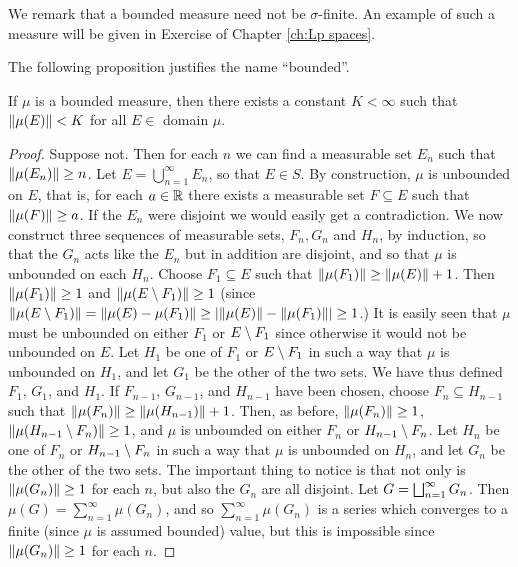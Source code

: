 We remark that a bounded measure need not be $\sigma$-finite. An example of such a measure will be given in Exercise of Chapter \ref{ch:Lp spaces}.

The following proposition justifies the name ``bounded''.

\begin{proposition}\label{prop:bounded measure are bounded}
If $\mu$ is a bounded measure, then there exists a constant $K<\infty$ such that $\norm{\mu(E)}<K$ for all $E\in$ domain $\mu$.
\end{proposition}

\begin{proof}
Suppose not. Then for each $n$ we can find a measurable set $E_n$ such that $\norm{\mu(E_n)}\geq n$. Let $E=\bigcup_{n=1}^\infty E_n$, so that $E\in S$. By construction, $\mu$ is unbounded on $E$, that is, for each $a\in\mathbb{R}$ there exists a measurable set $F\subseteq E$ such that $\norm{\mu(F)}\geq a$. If the $E_n$ were disjoint we would easily get a contradiction. We now construct three sequences of measurable sets, $F_n, G_n$ and $H_n$, by induction, so that the $G_n$ acts like the $E_n$ but in addition are disjoint, and so that $\mu$ is unbounded on each $H_n$. Choose $F_1\subseteq E$ such that $\norm{\mu(F_1)}\geq\norm{\mu(E)}+1$. Then $\norm{\mu(F_1)}\geq1$ and $\norm{\mu(E\setminus F_1)}\geq1$ (since $\norm{\mu(E\setminus F_1)}=\norm{\mu(E)-\mu(F_1)}\geq|\norm{\mu(E)}-\norm{\mu(F_1)}|\geq1$.) It is easily seen that $\mu$ must be unbounded on either $F_1$ or $E\setminus F_1$ since otherwise it would not be unbounded on $E$. Let $H_1$ be one of $F_1$ or $E\setminus F_1$ in such a way that $\mu$ is unbounded on $H_1$, and let $G_1$ be the other of the two sets. We have thus defined $F_1$, $G_1$, and $H_1$. If $F_{n-1}$, $G_{n-1}$, and $H_{n-1}$ have been chosen, choose $F_n\subseteq H_{n-1}$ such that $\norm{\mu(F_n)}\geq\norm{\mu(H_{n-1})}+1$. Then, as before, $\norm{\mu(F_n)}\geq1$, $\norm{\mu(H_{n-1}\setminus F_n)}\geq1$, and $\mu$ is unbounded on either $F_n$ or $H_{n-1}\setminus F_n$. Let $H_n$ be one of $F_n$ or $H_{n-1}\setminus F_n$ in such a way that $\mu$ is unbounded on $H_n$, and let $G_n$ be the other of the two sets. The important thing to notice is that not only is $\norm{\mu(G_n)}\geq1$ for each $n$, but also the $G_n$ are all disjoint. Let $G=\bigsqcup_{n=1}^\infty G_n$. Then $\mu(G)=\sum_{n=1}^\infty\mu(G_n)$, and so $\sum_{n=1}^\infty\mu(G_n)$ is a series which converges to a finite (since $\mu$ is assumed bounded) value, but this is impossible since $\norm{\mu(G_n)}\geq1$ for each $n$.
\end{proof}


